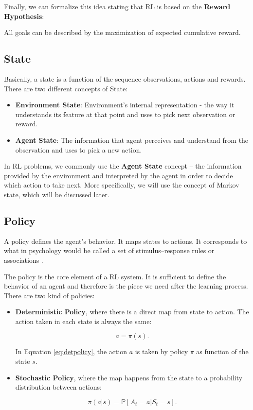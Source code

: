 Finally, we can formalize this idea stating that RL is based on the \textbf{Reward Hypothesis}:

\begin{definition}
	All goals can be described by the maximization of expected cumulative reward.
\end{definition}

\subsection{State}

Basically, a state is a function of the sequence observations, actions and rewards. There are two different concepts of State:

\begin{itemize}
	\item \textbf{Environment State}: Environment's internal representation - the way it understands its feature at that point and uses to pick next observation or reward.
	\item \textbf{Agent State}: The information that agent perceives and understand from the observation and uses to pick a new action.
\end{itemize}

In RL problems, we commonly use the \textbf{Agent State} concept -- the information provided by the environment and interpreted by the agent in order to decide which action to take next. More specifically, we will use the concept of Markov state, which will be discussed later.

\subsection{Policy}

A policy defines the agent's behavior. It maps states to actions. It corresponds to what in psychology would be called a set of stimulus–response rules or associations \cite{sutton1998rli}. 

The policy is the core element of a RL system. It is sufficient to define the behavior of an agent and therefore is the piece we need after the learning process. There are two kind of policies:

\begin{itemize}
	\item \textbf{Deterministic Policy}, where there is a direct map from state to action. The action taken in each state is always the same:
	
	\begin{equation}\label{eq:detpolicy}
	a = \pi(s).
	\end{equation}
	
	In Equation \ref{eq:detpolicy}, the action $a$ is taken by policy $\pi$ as function of the state $s$.
	
	\item \textbf{Stochastic Policy}, where the map happens from the state to a probability distribution between actions:
	
	\begin{equation}
	\pi (a | s) = \mathbb{P}[A_{t} = a | S_{t} = s].
	\end{equation}
\end{itemize}

